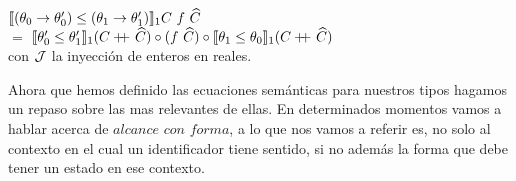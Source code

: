 \begin{definition}
\indent
$\semBrcks{(\theta_0 \rightarrow \theta'_0) \leq (\theta_1 \rightarrow \theta'_1)}_1 C \ f \ \widehat{C}$ \\
			\indent \indent \indent \indent \indent \indent
			$=$ 
			$\llbracket \theta'_0 \leq \theta'_1 \rrbracket_1 (C +\kern-1.3ex+\kern0.8ex \widehat{C}) 
				\circ 
			(f \ \widehat{C}) 
				\circ 
			\llbracket \theta_1 \leq \theta_0 \rrbracket_1 (C +\kern-1.3ex+\kern0.8ex \widehat{C}) 
			$\\

con $\mathcal{J}$ la inyecci\'on de enteros en reales.

\end{definition}

Ahora que hemos definido las ecuaciones sem\'anticas para nuestros tipos 
hagamos un repaso sobre las mas relevantes de ellas. En determinados momentos
vamos a hablar acerca de $\textit{alcance con forma}$, a lo que nos vamos
a referir es, no solo al contexto en el cual un identificador tiene sentido,
si no adem\'as la forma que debe tener un estado en ese contexto.

